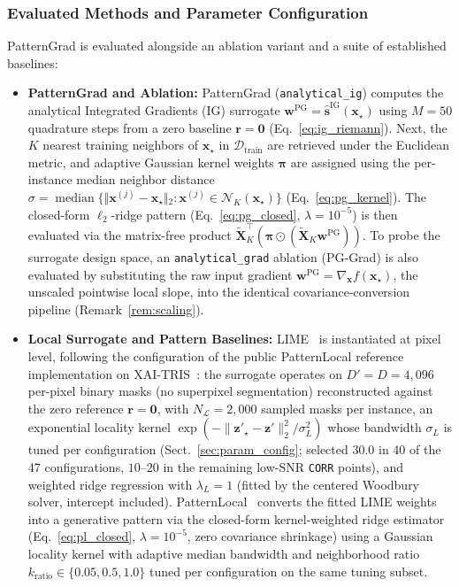 \documentclass[pdflatex,sn-mathphys-num]{sn-jnl}
\theoremstyle{thmstyleone}
\theoremstyle{thmstyletwo}%
\theoremstyle{thmstylethree}%
\begin{document}
\subsubsection{Evaluated Methods and Parameter Configuration}
PatternGrad is evaluated alongside an ablation variant and a suite of established baselines:
\begin{itemize}
    \item \textbf{PatternGrad and Ablation:} PatternGrad (\texttt{analytical\_ig}) computes the analytical Integrated Gradients (IG) surrogate $\mathbf{w}^{\text{PG}} = \hat{\mathbf{s}}^{\text{IG}}(\mathbf{x}_\star)$ using $M = 50$ quadrature steps from a zero baseline $\mathbf{r} = \mathbf{0}$ (Eq.~\eqref{eq:ig_riemann}). Next, the $K$ nearest training neighbors of $\mathbf{x}_\star$ in $\mathcal{D}_{\text{train}}$ are retrieved under the Euclidean metric, and adaptive Gaussian kernel weights $\boldsymbol{\pi}$ are assigned using the per-instance median neighbor distance $\sigma = \operatorname{median}\{\Vert{}\mathbf{x}^{(j)} - \mathbf{x}_\star\Vert{}_2 : \mathbf{x}^{(j)} \in \mathcal{N}_K(\mathbf{x}_\star)\}$ (Eq.~\eqref{eq:pg_kernel}). The closed-form $\ell_2$-ridge pattern (Eq.~\eqref{eq:pg_closed}, $\lambda = 10^{-5}$) is then evaluated via the matrix-free product $\tilde{\mathbf{X}}_K^{\top}(\boldsymbol{\pi} \odot (\tilde{\mathbf{X}}_K \mathbf{w}^{\text{PG}}))$. To probe the surrogate design space, an \texttt{analytical\_grad} ablation (PG-Grad) is also evaluated by substituting the raw input gradient $\mathbf{w}^{\text{PG}} = \nabla_{\mathbf{x}} f(\mathbf{x}_\star)$, the unscaled pointwise local slope, into the identical covariance-conversion pipeline (Remark~\ref{rem:scaling}).
    \item \textbf{Local Surrogate and Pattern Baselines:} LIME~\cite{ribeiro2016} is instantiated at pixel level, following the configuration of the public PatternLocal reference implementation on XAI-TRIS~\cite{gjoelbye2025}: the surrogate operates on $D' = D = 4{,}096$ per-pixel binary masks (no superpixel segmentation) reconstructed against the zero reference $\mathbf{r} = \mathbf{0}$, with $N_{\mathcal{L}} = 2{,}000$ sampled masks per instance, an exponential locality kernel $\exp(-\|\mathbf{z}'_\star - \mathbf{z}'\|_2^2 / \sigma_L^2)$ whose bandwidth $\sigma_L$ is tuned per configuration (Sect.~\ref{sec:param_config}; selected $30.0$ in 40 of the 47 configurations, $10$--$20$ in the remaining low-SNR \texttt{CORR} points), and weighted ridge regression with $\lambda_L = 1$ (fitted by the centered Woodbury solver, intercept included). PatternLocal~\cite{gjoelbye2025} converts the fitted LIME weights into a generative pattern via the closed-form kernel-weighted ridge estimator (Eq.~\eqref{eq:pl_closed}, $\lambda = 10^{-5}$, zero covariance shrinkage) using a Gaussian locality kernel with adaptive median bandwidth and neighborhood ratio $k_{\text{ratio}} \in \{0.05, 0.5, 1.0\}$ tuned per configuration on the same tuning subset.

\end{itemize}
\end{document}
